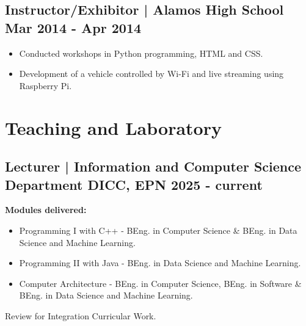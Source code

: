 \documentclass[11pt,a4paper]{article}
\begin{document}
\vspace{0.5em}
\subsection*{Instructor/Exhibitor | Alamos High School \hfill Mar 2014 - Apr 2014}
\begin{itemize}
    \item Conducted workshops in Python programming, HTML and CSS.
    \item Development of a vehicle controlled by Wi-Fi and live streaming using Raspberry Pi.
\end{itemize}

\section*{Teaching and Laboratory}

\subsection*{Lecturer | Information and Computer Science Department DICC, EPN \hfill 2025 - current}
\textbf{Modules delivered:}
\begin{itemize}
    \item Programming I with C++ - BEng. in Computer Science \& BEng. in Data Science and Machine Learning.
    \item Programming II with Java - BEng. in Data Science and Machine Learning.
    \item Computer Architecture - BEng. in Computer Science, BEng. in Software \& BEng. in Data Science and Machine Learning.
\end{itemize}
Review for Integration Curricular Work.

\vspace{0.5em}
\end{document}
